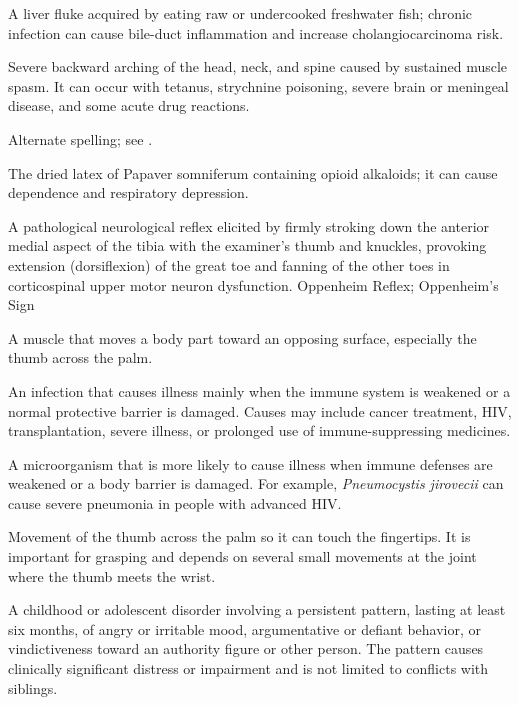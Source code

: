  A liver fluke acquired by eating raw or undercooked freshwater fish; chronic infection can cause bile-duct inflammation and increase cholangiocarcinoma risk.

 Severe backward arching of the head, neck, and spine caused by sustained muscle spasm. It can occur with tetanus, strychnine poisoning, severe brain or meningeal disease, and some acute drug reactions.

 Alternate spelling; see .

 The dried latex of Papaver somniferum containing opioid alkaloids; it can cause dependence and respiratory depression.

 A pathological neurological reflex elicited by firmly stroking down the anterior medial aspect of the tibia with the examiner's thumb and knuckles, provoking extension (dorsiflexion) of the great toe and fanning of the other toes in corticospinal upper motor neuron dysfunction.
\synonyms
Oppenheim Reflex; Oppenheim's Sign

 A muscle that moves a body part toward an opposing surface, especially the thumb across the palm.

 An infection that causes illness mainly when the immune system is weakened or a normal protective barrier is damaged. Causes may include cancer treatment, HIV, transplantation, severe illness, or prolonged use of immune-suppressing medicines.

 A microorganism that is more likely to cause illness when immune defenses are weakened or a body barrier is damaged. For example, \textit{Pneumocystis jirovecii} can cause severe pneumonia in people with advanced HIV.

 Movement of the thumb across the palm so it can touch the fingertips. It is important for grasping and depends on several small movements at the joint where the thumb meets the wrist.

 A childhood or adolescent disorder involving a persistent pattern, lasting at least six months, of angry or irritable mood, argumentative or defiant behavior, or vindictiveness toward an authority figure or other person. The pattern causes clinically significant distress or impairment and is not limited to conflicts with siblings.


